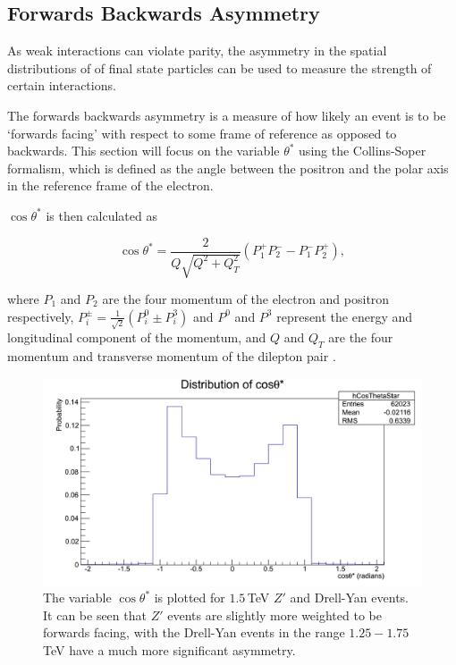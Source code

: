 \documentclass{article}
\begin{document}
\subsection{Forwards Backwards Asymmetry}
\label{sec:MCA_fwAsym}


As weak interactions can violate parity, the asymmetry in the spatial distributions of of final state particles can be used to measure the strength of certain interactions.
 
The forwards backwards asymmetry is a measure of how likely an event is to be `forwards facing' with respect to some frame of reference as opposed to backwards. This section will focus on the variable $\theta^*$ using the Collins-Soper formalism, which is defined as the angle between the positron and the polar axis in the reference frame of the electron.

$\cos\theta^*$ is then calculated as

\begin{equation}
\cos\theta^* = \frac{2}{Q\sqrt{Q^2 + Q^{2}_{T}}}( P^{+}_{1}P^{-}_{2} - P^{-}_{1}P^{+}_{2} ),
\end{equation}

where $P_1$ and $P_2$ are the four momentum of the electron and positron respectively, $P^{\pm}_{i} = \frac{1}{\sqrt{2}}(P^{0}_{i} \pm P^{3}_{i})$ and $P^0$ and $P^3$ represent the energy and longitudinal component of the momentum, and $Q$ and $Q_T$ are the four momentum and transverse momentum of the dilepton pair \cite{ForwardsBackwardsAsymmetry}.

\begin{figure}[h]
    \centering \includegraphics[scale=0.3]{images/cosThetaStar.png} \caption{The variable $\cos\theta^*$ is plotted for $1.5\,$TeV $Z'$ and Drell-Yan events. It can be seen that $Z'$ events are slightly more weighted to be forwards facing, with the Drell-Yan events in the range $1.25-1.75\,$TeV have a much more significant asymmetry. \label{fig:cosTheta} }
\end{figure}
\end{document}
